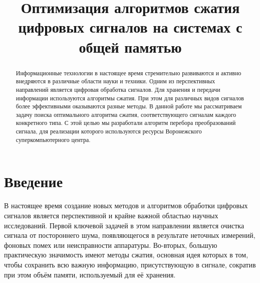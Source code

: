\documentclass[11pt, oneside, a4paper]{article}
\begin{document}

\title{Оптимизация алгоритмов сжатия цифровых сигналов на системах с общей памятью}


\begin{abstract}
Информационные технологии в настоящее время стремительно развиваются и активно внедряются в различные области науки и техники. Одним из перспективных направлений является цифровая обработка сигналов. Для хранения и передачи информации используются алгоритмы сжатия. При этом для различных видов сигналов более эффективными оказываются  разные методы. В данной работе мы рассматриваем задачу поиска оптимального алгоритма сжатия, соответствующего сигналам каждого конкретного типа. С этой целью мы разработали алгоритм перебора преобразований сигнала, для реализации которого используются ресурсы Воронежского суперкомпьютерного центра.
\end{abstract}



\section{Введение}

В настоящее время создание новых методов и алгоритмов обработки цифровых сигналов является перспективной и крайне важной областью научных исследований. Первой ключевой задачей в этом направлении является очистка сигнала от постороннего шума, появляющегося в результате неточных измерений, фоновых помех или неисправности аппаратуры. Во-вторых, большую практическую значимость имеют методы сжатия, основная идея которых в том, чтобы сохранить всю важную информацию, присутствующую в сигнале, сократив при этом объём памяти, используемый для её хранения.
\end{document}
